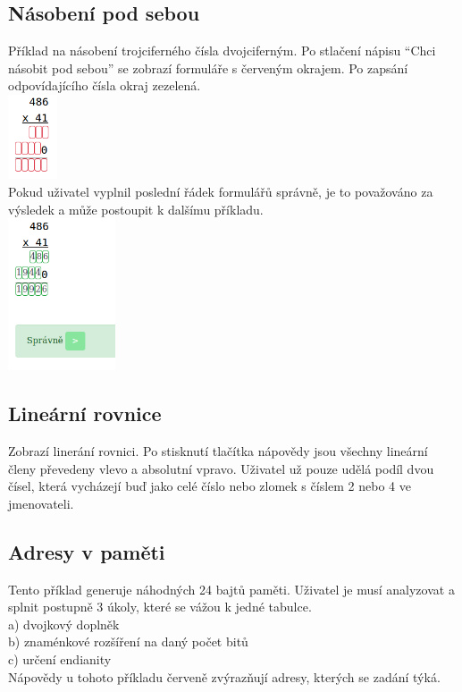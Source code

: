 \documentclass[
]{article}
\begin{document}
\subsection{Násobení pod sebou}

Příklad na násobení trojciferného čísla dvojciferným. Po stlačení nápisu
``Chci násobit pod sebou'' se zobrazí formuláře s červeným okrajem. Po
zapsání odpovídajícího čísla okraj zezelená.\\
\includegraphics[height=2.5cm]{../../doc-images/multiblank.png}\\
Pokud uživatel vyplnil
poslední řádek formulářů správně, je to považováno za výsledek a může
postoupit k dalšímu příkladu.\\
\includegraphics[height=4.5cm]{../../doc-images/multifull.png}\\

\subsection{Lineární rovnice}

Zobrazí linerání rovnici. Po stisknutí tlačítka nápovědy jsou všechny
lineární členy převedeny vlevo a absolutní vpravo. Uživatel už pouze
udělá podíl dvou čísel, která vycházejí buď jako celé číslo nebo zlomek
s číslem 2 nebo 4 ve jmenovateli.

\subsection{Adresy v paměti}

Tento příklad generuje náhodných 24 bajtů paměti. Uživatel je musí
analyzovat a splnit postupně 3 úkoly, které se vážou k jedné tabulce.\\
a) dvojkový doplněk\\
b) znaménkové rozšíření na daný počet bitů\\
c) určení endianity\\
Nápovědy u tohoto příkladu červeně zvýrazňují adresy, kterých se zadání týká.
\end{document}

